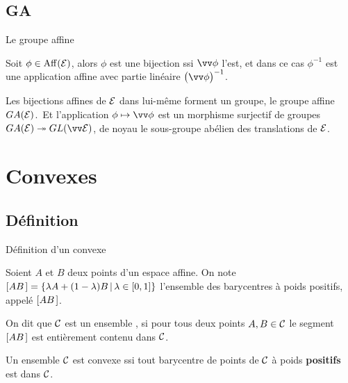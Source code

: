 \documentclass{m53beamer}
\begin{document}
\subsection{GA}
  \begin{frame}{Le groupe affine}
    \begin{proposition}
      Soit $\phi\in\operatorname{Aff}(\mathcal{E})$, alors $\phi$ est une bijection ssi $\vv\phi$ l'est, et dans ce cas $\phi^{-1}$ est une application affine avec partie linéaire $\big(\vv\phi\big)^{-1}$.
    \end{proposition}\pause
    \begin{proposition}
      Les bijections affines de $\mathcal{E}$ dans lui-même forment un groupe, le groupe affine $GA(\mathcal{E})$.\pause\ Et l'application $\phi\mapsto\vv\phi$ est un morphisme surjectif de groupes $GA(\ens{E})\twoheadrightarrow GL(\ev{E})$\pause, de noyau le sous-groupe abélien des translations de $\mathcal{E}$.
    \end{proposition}
  \end{frame}
\section{Convexes}
\subsection{Définition}
\begin{frame}{Définition d'un convexe}
  \begin{definition}
    Soient $A$ et $B$ deux points d'un espace affine. On note $[{AB}\kern.14em]=\left\{\lambda A + (1-\lambda)B\,|\, \lambda \in [0,1]\right\}$ l'ensemble des barycentres à poids positifs, appelé  $[{AB}\kern.14em]$.
  \end{definition}\pause
  \begin{definition}
    On dit que $\mathcal{C}$ est un ensemble , si pour tous deux points $A,B \in \mathcal{C}$ le segment $[{AB}\kern.14em]$ est entièrement contenu dans $\mathcal{C}$.
  \end{definition}\pause
  \begin{proposition}
    Un ensemble $\mathcal{C}$ est convexe ssi tout barycentre de points de $\mathcal{C}$ à poids \textbf{positifs} est dans $\mathcal{C}$.
  \end{proposition}
\end{frame}
\end{document}
